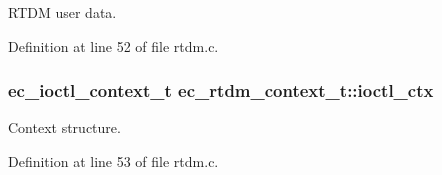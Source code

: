 R\-T\-D\-M user data. 



Definition at line 52 of file rtdm.\-c.

\subsubsection[{ioctl\-\_\-ctx}]{\setlength{\rightskip}{0pt plus 5cm}ec\-\_\-ioctl\-\_\-context\-\_\-t ec\-\_\-rtdm\-\_\-context\-\_\-t\-::ioctl\-\_\-ctx}\label{structec__rtdm__context__t_ad605852d8673c7094398ea5307d3737b}


Context structure. 



Definition at line 53 of file rtdm.\-c.

